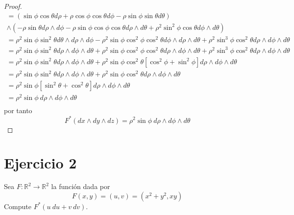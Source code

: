 \documentclass[12pt]{report}
\theoremstyle{largebreak}
\newcommand\cf[3]{\ensuremath{#1:#2\rightarrow#3}}
\begin{document}
\begin{proof}
\begin{multline*}
            =(\sin\phi\cos\theta d\rho+\rho\cos\phi\cos\theta d\phi-\rho\sin\phi\sin\theta d\theta)\\
            \wedge(-\rho\sin\theta d\rho\wedge d\phi-\rho \sin\phi\cos\phi\cos\theta d\rho\wedge d\theta+\rho^2\sin^2\phi\cos\theta d\phi\wedge d\theta)\\
            =\rho^2\sin\phi\sin^2\theta d\theta\wedge d\rho\wedge d\phi-\rho^2\sin\phi\cos^2\phi\cos^2\theta d\phi\wedge d\rho\wedge d\theta
            +\rho^2\sin^3\phi\cos^2\theta d\rho\wedge d\phi\wedge d\theta\\
            =\rho^2\sin\phi\sin^2\theta d\rho\wedge d\phi\wedge d\theta
            +\rho^2\sin\phi\cos^2\phi\cos^2\theta d\rho\wedge d\phi\wedge d\theta
            +\rho^2\sin^3\phi\cos^2\theta d\rho\wedge d\phi\wedge d\theta\\
            =\rho^2\sin\phi\sin^2\theta d\rho\wedge d\phi\wedge d\theta
            +\rho^2\sin\phi\cos^2\theta\left[\cos^2\phi+\sin^2\phi\right]d\rho\wedge d\phi\wedge d\theta\\
            =\rho^2\sin\phi\sin^2\theta d\rho\wedge d\phi\wedge d\theta
            +\rho^2\sin\phi\cos^2\theta d\rho\wedge d\phi\wedge d\theta\\
            =\rho^2\sin\phi\left[\sin^2\theta+\cos^2\theta\right] d\rho\wedge d\phi\wedge d\theta\\
            =\rho^2\sin\phi \:d\rho\wedge d\phi\wedge d\theta\\
        \end{multline*}
        por tanto
        \begin{equation*}
            F^*(dx\wedge dy\wedge dz)=\rho^2\sin\phi\:d\rho\wedge d\phi\wedge d\theta
        \end{equation*}
    \end{proof}

    \newpage

    \section{Ejercicio 2}

    \begin{excer}
        Sea $\cf{F}{\mathbb{R}^2}{\mathbb{R}^2}$ la función dada por
        \begin{equation*}
            F(x,y)=(u,v)=(x^2+y^2,xy)
        \end{equation*}
        Compute $F^*(u\:du+v\:dv)$.
    \end{excer}
\end{document}
